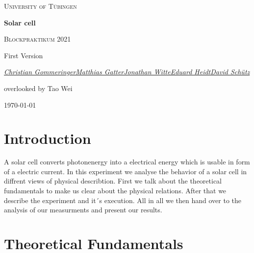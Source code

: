 \documentclass[a4paper, 12pt]{scrartcl}
\begin{document}
\begin{titlepage}
	\centering
	{\scshape\LARGE University of Tübingen \par}
	\vspace{2cm}
	{\huge\bfseries Solar cell \par}
	\vspace{2cm}
	{\Large \scshape Blockpraktikum 2021} \par
	\vspace{2cm}
	{\Large  First Version} \par
	\vspace{2cm}
	{\Large\itshape \underline{Christian Gommeringer}\space \space \underline{Matthias Gatter}\space \space \underline{Jonathan Witte}\space \space \underline{Eduard Heidt}\space \space \underline{David Schütz}\par}
	\vfill 
	{\large overlooked by Tao Wei}
	\vfill

	{\large \today\par}
\end{titlepage}
\newpage 
\tableofcontents 

\newpage
\section{Introduction} 
A solar cell converts photonenergy into a electrical energy which is usable in form of a electric current. In this experiment we analyse the behavior of a solar cell in diffrent views of physical describtion. First we talk about the theoretical fundamentals to make us clear about the physical relations. After that we describe the experiment and it´s execution. All in all we then hand over to the analysis of our measurments and present our results. 

\section{Theoretical Fundamentals}
\end{document}
